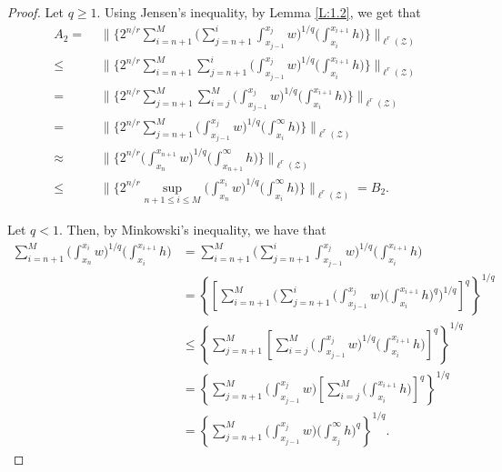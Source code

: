 \documentclass[12pt]{amsart}
\theoremstyle{plain}
\theoremstyle{definition}
\numberwithin{thm}{section}
\numberwithin{equation}{section}
\begin{document}
\begin{proof}
	Let $q \ge 1$. Using Jensen's inequality, by Lemma \ref{L:1.2}, we get that	
	\begin{align*}
	A_2 = & \,\, \bigg\| \bigg\{ 2^{n / r}  \sum_{i = n + 1}^M \bigg( \sum_{j = n+1}^i \int_{x_{j-1}}^{x_j} w \bigg)^{1 / q} \bigg( \int_{x_i}^{x_{i+1}} h \bigg) \bigg\} \bigg\|_{\ell^r ({\mathcal Z})} \\	
	\le & \,\,\bigg\| \bigg\{ 2^{n / r} \sum_{i = n + 1}^M \sum_{j = n+1}^i \bigg(
	\int_{x_{j-1}}^{x_j} w \bigg)^{1 / q} \bigg( \int_{x_i}^{x_{i+1}} h \bigg)\bigg\} \bigg\|_{\ell^r ({\mathcal Z})} \\	
	= & \,\, \bigg\| \bigg\{ 2^{n / r}  \sum_{j = n + 1}^M \sum_{i = j}^M \bigg(
	\int_{x_{j-1}}^{x_j} w \bigg)^{1 / q} \bigg( \int_{x_i}^{x_{i+1}} h \bigg) \bigg\} \bigg\|_{\ell^r ({\mathcal Z})} \\	
	= & \,\,\bigg\| \bigg\{ 2^{n / r}  \sum_{j = n + 1}^M \bigg(
	\int_{x_{j-1}}^{x_j} w \bigg)^{1 / q} \bigg( \int_{x_i}^{\infty} h \bigg) \bigg\} \bigg\|_{\ell^r ({\mathcal Z})} \\	
	\approx & \,\,\bigg\| \bigg\{ 2^{n / r} \bigg(
	\int_{x_n}^{x_{n+1}} w \bigg)^{1 / q} \bigg( \int_{x_{n+1}}^{\infty} h \bigg) \bigg\} \bigg\|_{\ell^r ({\mathcal Z})}\\
	\le & \,\,\bigg\| \bigg\{  2^{n / r} \sup_{n + 1 \le i \le M}  \bigg(
	\int_{x_n}^{x_i} w \bigg)^{1 / q} \bigg( \int_{x_i}^{\infty} h\bigg)\bigg\} \bigg\|_{\ell^r({\mathcal Z})} = B_2.
	\end{align*}
	
	Let $q < 1$. Then, by Minkowski's inequality, we have that
	\begin{align*}
	\sum_{i = n + 1}^M \bigg(
	\int_{x_n}^{x_i} w \bigg)^{1 / q} \bigg( \int_{x_i}^{x_{i+1}} h \bigg)  & = \sum_{i = n+ 1}^M \bigg(
	\sum_{j=n+1}^i \int_{x_{j-1}}^{x_j} w \bigg)^{1 / q} \bigg( \int_{x_i}^{x_{i+1}} h \bigg) \\
	& = \left\{ \left[ \sum_{i=n+ 1}^M \bigg( \sum_{j=n+1}^i \bigg( \int_{x_{j-1}}^{x_j} w\bigg) \bigg( \int_{x_i}^{x_{i+1}} h \bigg)^q \bigg)^{1/q}\right]^q \right\}^{1/q} \\
	& \le \left\{ \sum_{j=n+1}^M \left[ \sum_{i=j}^M \bigg(\int_{x_{j-1}}^{x_j} w\bigg)^{1/q} \bigg( \int_{x_i}^{x_{i+1}} h \bigg) \right]^q \right\}^{1/q} \\ 
	& = \left\{ \sum_{j=n+1}^M \bigg(\int_{x_{j-1}}^{x_j} w\bigg) \left[ \sum_{i=j}^M \bigg( \int_{x_i}^{x_{i+1}} h \bigg) \right]^q \right\}^{1/q} \\ 
	& = \left\{ \sum_{j=n+1}^M \bigg(\int_{x_{j-1}}^{x_j} w\bigg) \bigg( \int_{x_j}^{\infty} h \bigg)^q \right\}^{1/q}.
	\end{align*}


\end{proof}
\end{document}
